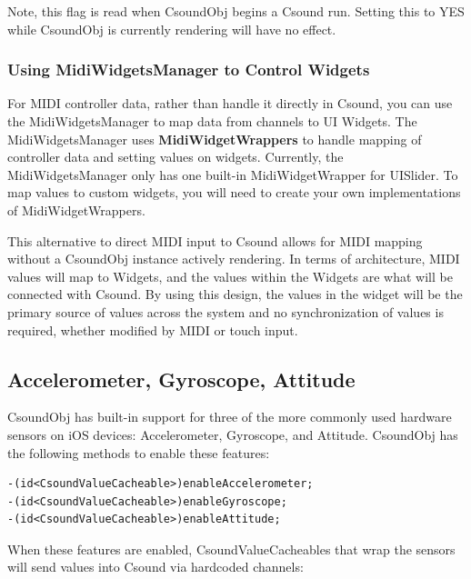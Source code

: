 \documentclass[11pt]{article}
\begin{document}
Note, this flag is read when CsoundObj begins a Csound run.  Setting this to YES while CsoundObj is currently rendering will have no effect. 

\subsubsection{Using MidiWidgetsManager to Control Widgets}

For MIDI controller data, rather than handle it directly in Csound, you can use the MidiWidgetsManager to map data from channels to UI Widgets.  The MidiWidgetsManager uses \textbf{MidiWidgetWrappers} to handle mapping of controller data and setting values on widgets.  Currently, the MidiWidgetsManager only has one built-in MidiWidgetWrapper for UISlider. To map values to custom widgets, you will need to create your own implementations of MidiWidgetWrappers. 

This alternative to direct MIDI input to Csound allows for MIDI mapping without a CsoundObj instance actively rendering. In terms of architecture, MIDI values will map to Widgets, and the values within the Widgets are what will be connected with Csound.  By using this design, the values in the widget will be the primary source of values across the system and no synchronization of values is required, whether modified by MIDI or touch input. 

\subsection{Accelerometer, Gyroscope, Attitude}

CsoundObj has built-in support for three of the more commonly used hardware sensors on iOS devices: Accelerometer, Gyroscope, and Attitude. CsoundObj has the following methods to enable these features:


\begin{lstlisting}[caption=CsoundObj Hardware Sensor Methods]
-(id<CsoundValueCacheable>)enableAccelerometer;
-(id<CsoundValueCacheable>)enableGyroscope;
-(id<CsoundValueCacheable>)enableAttitude; 
\end{lstlisting}

When these features are enabled, CsoundValueCacheables that wrap the sensors will send values into Csound via hardcoded channels:
\end{document}
